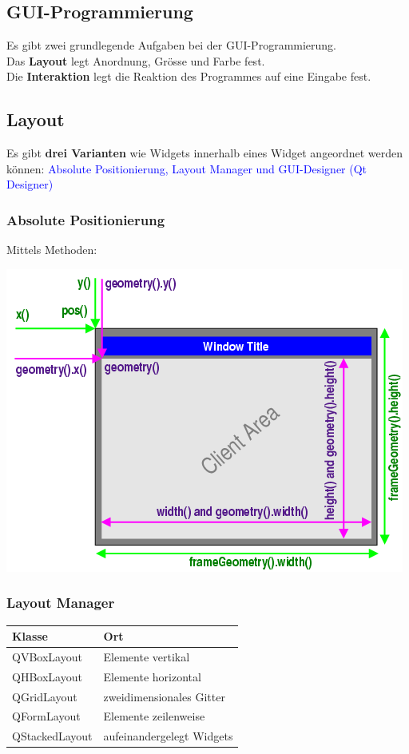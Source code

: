 \subsection{GUI-Programmierung}
Es gibt zwei grundlegende Aufgaben bei der GUI-Programmierung.\\
Das \textbf{Layout} legt Anordnung, Grösse  und Farbe fest.\\
Die \textbf{Interaktion} legt die Reaktion des Programmes auf eine Eingabe fest. \\

\subsection{Layout}
Es gibt \textbf{drei Varianten} wie Widgets innerhalb eines Widget angeordnet werden können: \newline
\textcolor{blue}{Absolute Positionierung, Layout Manager und GUI-Designer (Qt Designer)}

\subsubsection{Absolute Positionierung}
Mittels Methoden:
\begin{multicols}{2}	
	
	
	\includegraphics[width=0.8\linewidth]{images/geometry.png}
\end{multicols}

\subsubsection{Layout Manager} %
	\begin{tabular}{|l|l|}
		\hline \textbf{Klasse} & \textbf{Ort}\\
		\hline QVBoxLayout & Elemente vertikal\\
		\hline QHBoxLayout & Elemente horizontal\\
		\hline QGridLayout & zweidimensionales Gitter\\
		\hline QFormLayout & Elemente zeilenweise\\
		\hline QStackedLayout & aufeinandergelegt Widgets\\
		\hline
	\end{tabular}
	
